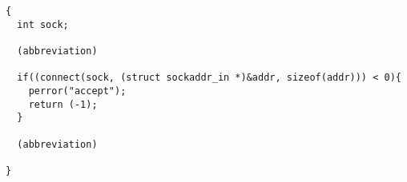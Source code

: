 \begin{verbatim}
{
  int sock;

  (abbreviation)

  if((connect(sock, (struct sockaddr_in *)&addr, sizeof(addr))) < 0){
    perror("accept");
    return (-1);
  }

  (abbreviation)

}
\end{verbatim}
